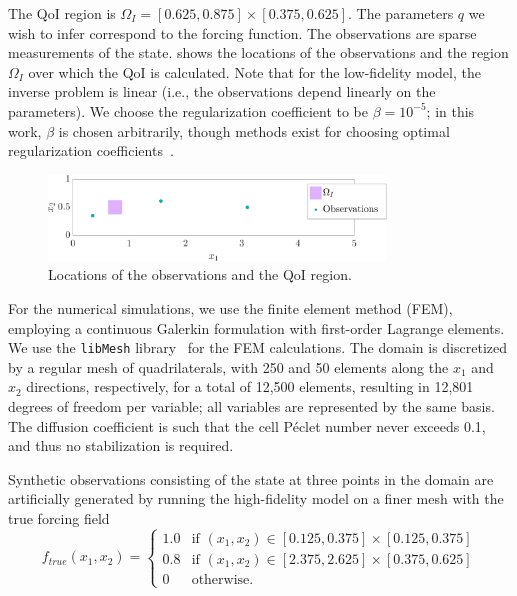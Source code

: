 \documentclass[review,sort&compress]{elsarticle}
\begin{document}
The QoI region is $\Omega_I=[0.625,0.875]\times[0.375,0.625]$. The parameters $q$ we wish to infer correspond to the forcing function. The observations are sparse measurements of the state.
 shows the locations of the observations and the region $\Omega_I$ over which the QoI is calculated. Note that for the low-fidelity model, the inverse problem is linear (i.e., the observations depend linearly on the parameters). We choose the regularization coefficient to be $\beta=10^{-5}$; in this work, $\beta$ is chosen arbitrarily, though methods exist for choosing optimal regularization coefficients~\cite{BelgeKilmerMiller02,Calvetal00}.
%
\begin{figure}[htbp]
\centering
\includegraphics[width=0.8\textwidth]{baseSeries/setup_3_3.pdf}
\caption{Locations of the observations and the QoI region.}
\label{fig:baseSetup}
\end{figure}
%

For the numerical simulations, we use the finite element method (FEM), employing a continuous Galerkin formulation with first-order Lagrange elements. We use the \texttt{libMesh} library~\cite{libMeshPaper} for the FEM calculations. The domain is discretized by a regular mesh of quadrilaterals, with 250 and 50 elements along the $x_1$ and $x_2$ directions, respectively, for a total of 12,500 elements, resulting in 12,801 degrees of freedom per variable; all variables are represented by the same basis. The diffusion coefficient is such that the cell P\'{e}clet number never exceeds 0.1, and thus no stabilization is required.

Synthetic observations consisting of the state at three points in the domain are artificially generated by running the high-fidelity model on a finer mesh with the true forcing field
%
\begin{equation}
f_{true}(x_1,x_2)=
\begin{cases}
1.0 & \textrm{if }(x_1,x_2)\in[0.125,0.375]\times[0.125,0.375] \\
0.8 & \textrm{if }(x_1,x_2)\in[2.375,2.625]\times[0.375,0.625] \\
0 & \textrm{otherwise}.
\end{cases}
\end{equation}
%
%
\end{document}
